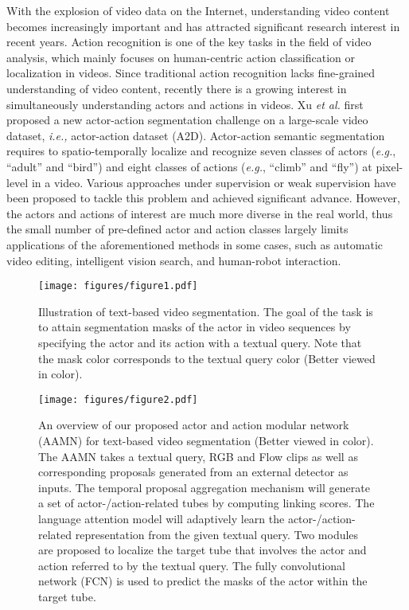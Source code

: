 \documentclass[journal]{IEEEtran}
\begin{document}
With the explosion of video data on the Internet, understanding video content becomes increasingly important and has attracted significant research interest in recent years. Action recognition is one of the key tasks in the field of video analysis, which mainly focuses on human-centric action classification \cite{niebles2007hierarchical,girdhar2017actionvlad} or localization \cite{klaser2010human,shou2016temporal} in videos. Since traditional action recognition lacks fine-grained understanding of video content, recently there is a growing interest in simultaneously understanding actors and actions in videos. Xu \emph{et al.} \cite{xu2015can} first proposed a new actor-action segmentation challenge on a large-scale video dataset, \emph{i.e.,} actor-action dataset (A2D). Actor-action semantic segmentation requires to spatio-temporally localize and recognize seven classes of actors (\emph{e.g.}, ``adult'' and ``bird'') and eight classes of actions (\emph{e.g.}, ``climb'' and ``fly'') at pixel-level in a video. Various approaches under supervision \cite{xu2016actor,qiu2017learning,kalogeiton2017joint,dang2018actor,ji2018end,Rana_2021_WACV} or weak supervision \cite{yan2017weakly,Chen2020Learning} have been proposed to tackle this problem and achieved significant advance. However, the actors and actions of interest are much more diverse in the real world, thus the small number of pre-defined actor and action classes largely limits applications of the aforementioned methods in some cases, such as automatic video editing, intelligent vision search, and human-robot interaction.


\begin{figure}
\centering
\texttt{[image: figures/figure1.pdf]}
\caption{Illustration of text-based video segmentation. The goal of the task is to attain segmentation masks of the actor in video sequences by specifying the actor and its action with a textual query. Note that the mask color corresponds to the textual query color (Better viewed in color).}
\label{fig:gifure1}
\vspace{-0.2cm}
\end{figure}

\begin{figure*}[t]
\centering
\texttt{[image: figures/figure2.pdf]}  \vspace{-0.2cm}
\caption{An overview of our proposed actor and action modular network (AAMN) for text-based video segmentation (Better viewed in color). The AAMN takes a textual query, RGB and Flow clips as well as corresponding proposals generated from an external detector as inputs. The temporal proposal aggregation mechanism will generate a set of actor-/action-related tubes by computing linking scores. The language attention model will adaptively learn the actor-/action-related representation from the given textual query. Two modules are proposed to localize the target tube that involves the actor and action referred to by the textual query. The fully convolutional network (FCN) is used to predict the masks of the actor within the target tube.}
\label{fig:framework}
\vspace{-0.4cm}
\end{figure*}
\end{document}
